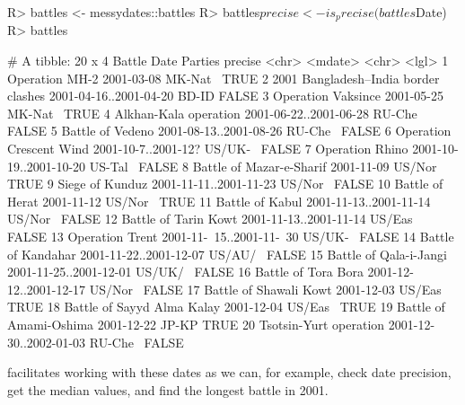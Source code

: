 \documentclass[
]{jss}
\begin{document}
\begin{CodeChunk}
\begin{CodeInput}
R> battles <- messydates::battles
R> battles$precise <- is_precise(battles$Date)
R> battles
\end{CodeInput}
\begin{CodeOutput}
# A tibble: 20 x 4
   Battle                               Date                     Parties precise
   <chr>                                <mdate>                  <chr>   <lgl>  
 1 Operation MH-2                       2001-03-08               MK-Nat~ TRUE   
 2 2001 Bangladesh–India border clashes 2001-04-16..2001-04-20   BD-ID   FALSE  
 3 Operation Vaksince                   2001-05-25               MK-Nat~ TRUE   
 4 Alkhan-Kala operation                2001-06-22..2001-06-28   RU-Che~ FALSE  
 5 Battle of Vedeno                     2001-08-13..2001-08-26   RU-Che~ FALSE  
 6 Operation Crescent Wind              2001-10-7..2001-12?      US/UK-~ FALSE  
 7 Operation Rhino                      2001-10-19..2001-10-20   US-Tal~ FALSE  
 8 Battle of Mazar-e-Sharif             2001-11-09               US/Nor~ TRUE   
 9 Siege of Kunduz                      2001-11-11..2001-11-23   US/Nor~ FALSE  
10 Battle of Herat                      2001-11-12               US/Nor~ TRUE   
11 Battle of Kabul                      2001-11-13..2001-11-14   US/Nor~ FALSE  
12 Battle of Tarin Kowt                 2001-11-13..2001-11-14   US/Eas~ FALSE  
13 Operation Trent                      2001-11-~15..2001-11-~30 US/UK-~ FALSE  
14 Battle of Kandahar                   2001-11-22..2001-12-07   US/AU/~ FALSE  
15 Battle of Qala-i-Jangi               2001-11-25..2001-12-01   US/UK/~ FALSE  
16 Battle of Tora Bora                  2001-12-12..2001-12-17   US/Nor~ FALSE  
17 Battle of Shawali Kowt               2001-12-03               US/Eas~ TRUE   
18 Battle of Sayyd Alma Kalay           2001-12-04               US/Eas~ TRUE   
19 Battle of Amami-Oshima               2001-12-22               JP-KP   TRUE   
20 Tsotsin-Yurt operation               2001-12-30..2002-01-03   RU-Che~ FALSE  
\end{CodeOutput}
\end{CodeChunk}

 facilitates working with these dates as we can, for
example, check date precision, get the median values, and find the
longest battle in 2001.
\end{document}

